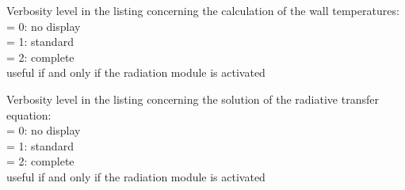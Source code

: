 {Verbosity level in the listing concerning the calculation of
the wall temperatures:\\
\hspace*{1.3cm}= 0: no display\\
\hspace*{1.3cm}= 1: standard\\
\hspace*{1.3cm}= 2: complete\\
useful if and only if the radiation module is activated}

{Verbosity level in the listing concerning the solution of
the radiative transfer equation:\\
\hspace*{1.3cm}= 0: no display\\
\hspace*{1.3cm}= 1: standard\\
\hspace*{1.3cm}= 2: complete\\
useful if and only if the radiation module is activated}

